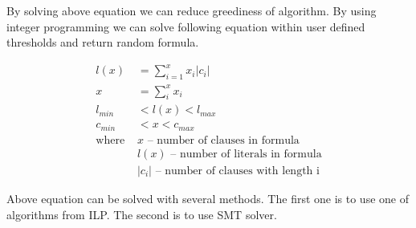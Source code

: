 By solving above equation we can reduce greediness of algorithm. By using integer programming we can solve following equation within user defined thresholds and return random formula.

\begin{align}
	l(x) &= \sum_{i=1}^{x} x_i |c_i| \\
	x &= \sum_i^x x_i \\
	l_{min} &< l(x) < l_{max} \\
	c_{min} &< x < c_{max} \\
	\text{where } 
		&x \text{ -- number of clauses in formula} \nonumber \\
		&l(x) \text{ -- number of literals in formula} \nonumber  \\
		&|c_i| \text{ -- number of clauses with length i} \nonumber
\end{align}

Above equation can be solved with several methods. The first one is to use one of algorithms from \gls{ILP}. The second is to use \gls{SMT} solver.
